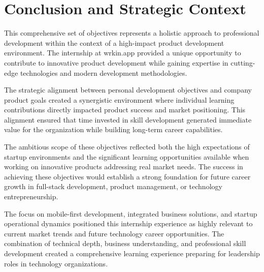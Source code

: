 \section{Conclusion and Strategic Context}

This comprehensive set of objectives represents a holistic approach to professional development within the context of a high-impact product development environment. The internship at wrkin.app provided a unique opportunity to contribute to innovative product development while gaining expertise in cutting-edge technologies and modern development methodologies.

The strategic alignment between personal development objectives and company product goals created a synergistic environment where individual learning contributions directly impacted product success and market positioning. This alignment ensured that time invested in skill development generated immediate value for the organization while building long-term career capabilities.

The ambitious scope of these objectives reflected both the high expectations of startup environments and the significant learning opportunities available when working on innovative products addressing real market needs. The success in achieving these objectives would establish a strong foundation for future career growth in full-stack development, product management, or technology entrepreneurship.

The focus on mobile-first development, integrated business solutions, and startup operational dynamics positioned this internship experience as highly relevant to current market trends and future technology career opportunities. The combination of technical depth, business understanding, and professional skill development created a comprehensive learning experience preparing for leadership roles in technology organizations.